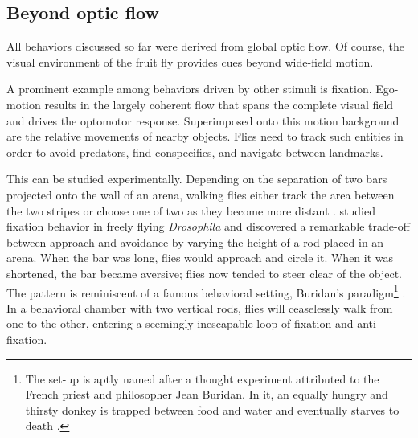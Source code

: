 \subsection{Beyond optic flow}
All behaviors discussed so far were derived from global optic flow. Of course, the visual environment of the fruit fly provides cues beyond wide-field motion.

A prominent example among behaviors driven by other stimuli is fixation. Ego-motion results in the largely coherent flow that spans the complete visual field and drives the optomotor response. Superimposed onto this motion background are the relative movements of nearby objects. Flies need to track such entities in order to avoid predators, find conspecifics, and navigate between landmarks.

This can be studied experimentally. Depending on the separation of two bars projected onto the wall of an arena, walking flies either track the area between the two stripes or choose one of two as they become more distant \citep{Horn:1975aa}. \citet{Maimon:2008go} studied fixation behavior in freely flying \textit{Drosophila} and discovered a remarkable trade-off between approach and avoidance by varying the height of a rod placed in an arena. When the bar was long, flies would approach and circle it. When it was shortened, the bar became aversive; flies now tended to steer clear of the object. The pattern is reminiscent of a famous behavioral setting, Buridan's paradigm\footnote{The set-up is aptly named after a thought experiment attributed to the French priest and philosopher Jean Buridan. In it, an equally hungry and thirsty donkey is trapped between food and water and eventually starves to death \citep{Knowles}.} \citep{Buelthoff:1982aa}. In a behavioral chamber with two vertical rods, flies will ceaselessly walk from one to the other, entering a seemingly inescapable loop of fixation and anti-fixation.

